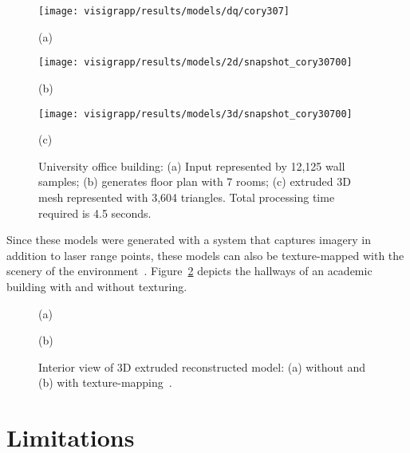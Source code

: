 \documentclass[12pt,onecolumn,oneside]{book}
\begin{document}
\begin{figure}[t]
	\centering
	
	\begin{minipage}[b]{0.4\linewidth}
	\centerline{\texttt{[image: visigrapp/results/models/dq/cory307]}}
	\centerline{(a)}
	\end{minipage}
	\hfill
	\begin{minipage}[b]{0.4\linewidth}
	\centerline{\texttt{[image: visigrapp/results/models/2d/snapshot\_cory30700]}}
	\centerline{(b)}
	\end{minipage}
	\begin{minipage}[b]{0.75\linewidth}
	\centerline{\texttt{[image: visigrapp/results/models/3d/snapshot\_cory30700]}}
	\centerline{(c)}
	\end{minipage}

	\caption[Floor plan of a university office area and hallway.]{University office building: (a) Input represented by 12,125 wall samples; (b) generates floor plan with 7 rooms; (c) extruded 3D mesh represented with 3,604 triangles.  Total processing time required is 4.5 seconds.}
	\label{fig:visigrapp_results_e}
\end{figure}

Since these models were generated with a system that captures imagery in addition to laser range points, these models can also be texture-mapped with the scenery of the environment~\cite{Cheng13}.  Figure~\ref{fig:visigrapp_texture} depicts the hallways of an academic building with and without texturing.

\begin{figure}[t]
   \centering
   \centerline{(a)}
   \hfill
   \centerline{(b)}
   \caption[Interior view of a texture-mapped extruded floor plan.]{Interior view of 3D extruded reconstructed model: (a) without and (b) with texture-mapping~\cite{Cheng13}.
   \protect
   \label{fig:visigrapp_texture}}
\end{figure}

\FloatBarrier
\section{Limitations}
\label{sec:fp_limitations}
\end{document}
